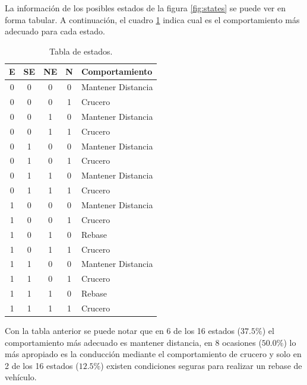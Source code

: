 \newpage
La información de los posibles estados de la figura \ref{fig:states} se puede ver en forma tabular. A continuación, el cuadro \ref{tab:states} indica cual es el comportamiento más adecuado para cada estado.
\begin{table}[h]
    \begin{center}
        \begin{tabular}{cccc||l}
        \hline
            E & SE & NE & N & Comportamiento\\ \hline \hline
            0 & 0 & 0 & 0 & Mantener Distancia\\ 
            0 & 0 & 0 & 1 & Crucero\\
            0 & 0 & 1 & 0 & Mantener Distancia\\
            0 & 0 & 1 & 1 & Crucero\\
            0 & 1 & 0 & 0 & Mantener Distancia\\
            0 & 1 & 0 & 1 & Crucero\\
            0 & 1 & 1 & 0 & Mantener Distancia\\
            0 & 1 & 1 & 1 & Crucero\\
            1 & 0 & 0 & 0 & Mantener Distancia\\
            1 & 0 & 0 & 1 & Crucero\\
            1 & 0 & 1 & 0 & Rebase\\
            1 & 0 & 1 & 1 & Crucero\\
            1 & 1 & 0 & 0 & Mantener Distancia\\
            1 & 1 & 0 & 1 & Crucero\\
            1 & 1 & 1 & 0 & Rebase\\
            1 & 1 & 1 & 1 & Crucero\\ \hline
        \end{tabular}
    \end{center}
    \caption{Tabla de estados.}
    \label{tab:states}
\end{table}

Con la tabla anterior se puede notar que en 6 de los 16 estados ($37.5\%$) el comportamiento más adecuado es mantener distancia, en 8 ocasiones ($50.0\%$) lo más apropiado es la conducción mediante el comportamiento de crucero y solo en 2 de los 16 estados ($12.5\%$) existen condiciones seguras para realizar un rebase de vehículo. 

